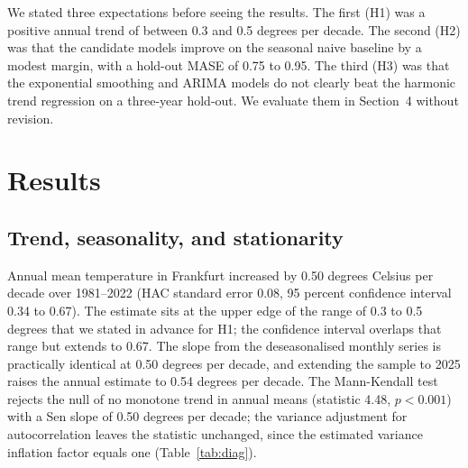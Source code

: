 \documentclass[11pt]{article}
\begin{document}
We stated three expectations before seeing the results. The first (H1) was a positive annual trend of between 0.3 and 0.5 degrees per decade. The second (H2) was that the candidate models improve on the seasonal naive baseline by a modest margin, with a hold-out MASE of 0.75 to 0.95. The third (H3) was that the exponential smoothing and ARIMA models do not clearly beat the harmonic trend regression on a three-year hold-out. We evaluate them in Section~4 without revision.

\section{Results}

\subsection{Trend, seasonality, and stationarity}

Annual mean temperature in Frankfurt increased by 0.50 degrees Celsius per decade over 1981--2022 (HAC standard error 0.08, 95 percent confidence interval 0.34 to 0.67).
The estimate sits at the upper edge of the range of 0.3 to 0.5 degrees that we stated in advance for H1; the confidence interval overlaps that range but extends to 0.67. The slope from the deseasonalised monthly series is practically identical at 0.50 degrees per decade, and extending the sample to 2025 raises the annual estimate to 0.54 degrees per decade.
The Mann-Kendall test rejects the null of no monotone trend in annual means (statistic 4.48, $p<0.001$) with a Sen slope of 0.50 degrees per decade; the variance adjustment for autocorrelation leaves the statistic unchanged, since the estimated variance inflation factor equals one (Table~\ref{tab:diag}).
\end{document}
